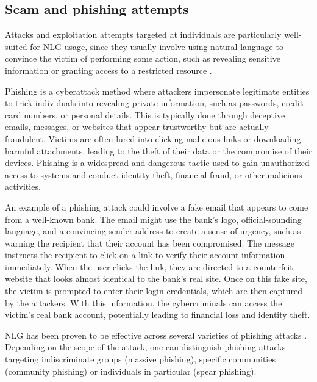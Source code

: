 \subsection{Scam and phishing attempts}

Attacks and exploitation attempts targeted at individuals are particularly well-suited for NLG usage, since they usually involve using natural language to convince the victim of performing some action, such as revealing sensitive information or granting access to a restricted resource \citep{alkhalil2021phishing}.

Phishing is a cyberattack method where attackers impersonate legitimate entities to trick individuals into revealing private information, such as passwords, credit card numbers, or personal details.
This is typically done through deceptive emails, messages, or websites that appear trustworthy but are actually fraudulent. Victims are often lured into clicking malicious links or downloading harmful attachments, leading to the theft of their data or the compromise of their devices.
Phishing is a widespread and dangerous tactic used to gain unauthorized access to systems and conduct identity theft, financial fraud, or other malicious activities.

An example of a phishing attack could involve a fake email that appears to come from a well-known bank. The email might use the bank's logo, official-sounding language, and a convincing sender address to create a sense of urgency, such as warning the recipient that their account has been compromised.
The message instructs the recipient to click on a link to verify their account information immediately. When the user clicks the link, they are directed to a counterfeit website that looks almost identical to the bank's real site.
Once on this fake site, the victim is prompted to enter their login credentials, which are then captured by the attackers.
With this information, the cybercriminals can access the victim's real bank account, potentially leading to financial loss and identity theft.

NLG has been proven to be effective across several varieties of phishing attacks \citep{Giaretta_2019}. Depending on the scope of the attack, one can distinguish phishing attacks targeting indiscriminate groups (massive phishing), specific communities (community phishing) or individuals in particular (spear phishing).

